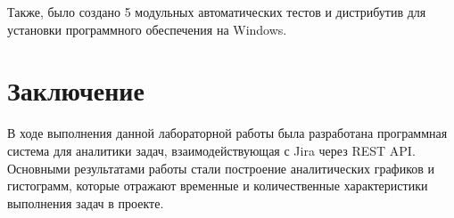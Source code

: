 \documentclass{article}
\begin{document}
Также, было создано 5 модульных автоматических тестов и дистрибутив для установки программного обеспечения на Windows. 

\newpage
\section{Заключение}
В ходе выполнения данной лабораторной работы была разработана программная система для аналитики задач, взаимодействующая с Jira через REST API. Основными результатами работы стали построение аналитических графиков и гистограмм, которые отражают временные и количественные характеристики выполнения задач в проекте.
\end{document}
